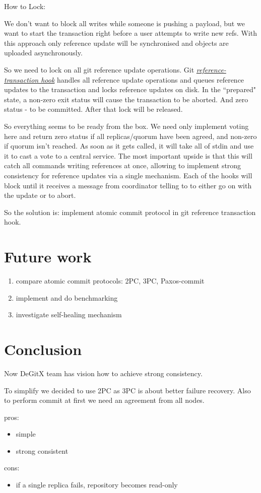 \documentclass[acmlarge, screen, nonacm]{acmart}
\begin{document}
How to Lock:

We don't want to block all writes while someone is pushing a payload,
but we want to start the transaction right before a user attempts to write new refs.
With this approach only reference update will be synchronised and objects are uploaded asynchronously.

So we need to lock on all git reference update operations.
Git \emph{\href{https://git-scm.com/docs/githooks.html\#_reference_transaction}{reference-transaction hook}}
handles all reference update operations and queues reference updates to the transaction and locks reference updates on disk.
In the ``prepared" state, a non-zero exit status will cause the transaction to be aborted.
And zero status - to be committed.
After that lock will be released.

So everything seems to be ready from the box.
We need only implement voting here and return zero status if all replicas/quorum have been agreed, and non-zero if quorum isn't reached.
As soon as it gets called, it will take all
of stdin and use it to cast a vote to a central service.
The most important upside is that this will catch all commands writing
references at once, allowing to implement strong consistency for
reference updates via a single mechanism.
Each of the hooks will block until it receives a message from coordinator telling to to either go on with the update or to abort.

So the solution is: implement atomic commit protocol in git reference transaction hook.

\section{Future work}

\begin{enumerate}
  \item compare atomic commit protocols: 2PC, 3PC, Paxos-commit
  \item implement and do benchmarking
  \item investigate self-healing mechanism
\end{enumerate}

\section{Conclusion}

Now DeGitX team has vision how to achieve strong consistency.

To simplify we decided to use 2PC as 3PC is about better failure recovery.
Also to perform commit at first we need an agreement from all nodes.

pros:
\begin{itemize}
  \item simple
  \item strong consistent
\end{itemize}

cons:
\begin{itemize}
  \item if a single replica fails, repository becomes read-only
\end{itemize}
\end{document}
